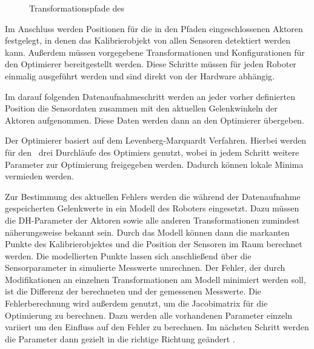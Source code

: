 \begin{figure}[Htbp] \centering {}
   \caption{Transformationspfade des \cob} \label{fig:pfade} \end{figure}

Im Anschluss werden Positionen für die in den Pfaden eingeschlossenen Aktoren
festgelegt, in denen das Kalibrierobjekt von allen Sensoren detektiert werden
kann. Außerdem müssen vorgegebene Transformationen und Konfigurationen für den
Optimierer bereitgestellt werden. Diese Schritte müssen für jeden Roboter
einmalig ausgeführt werden und sind direkt von der Hardware abhängig. 

Im darauf folgenden Datenaufnahmeschritt werden an jeder vorher definierten
Position die Sensordaten zusammen mit den aktuellen Gelenkwinkeln der Aktoren
aufgenommen. Diese Daten werden dann an den Optimierer übergeben.

Der Optimierer basiert auf dem Levenberg-Marquardt Verfahren\cite[Abschnitt 1]{pr2_estimation}.
Hierbei werden
für den \cob\ drei Durchläufe des Optimiers genutzt, wobei in jedem Schritt
weitere Parameter zur Optimierung freigegeben werden. Dadurch können lokale
Minima vermieden werden.

Zur Bestimmung des aktuellen Fehlers werden die während der Datenaufnahme
gespeicherten Gelenkwerte in ein Modell des Roboters eingesetzt. Dazu müssen
die \ac{DH-Parameter} der Aktoren sowie alle anderen Transformationen zumindest
näherungsweise bekannt sein. Durch das Modell können dann die markanten Punkte
des Kalibrierobjektes und die Position der Sensoren im Raum berechnet werden.
Die modellierten Punkte lassen sich anschließend über die Sensorparameter in
simulierte Messwerte umrechnen. Der Fehler, der durch Modifikationen an einzelnen
Transformationen am Modell minimiert werden soll, ist die Differenz der
berechneten und der gemessenen Messwerte.\cite{levi2012autonomous}
Die Fehlerberechnung wird außerdem genutzt, um die Jacobimatrix für die
Optimierung zu berechnen. Dazu werden alle
vorhandenen Parameter einzeln variiert um den Einfluss auf den Fehler zu berechnen.
Im nächsten Schritt werden die Parameter dann gezielt in die richtige Richtung
geändert \cite{forsyth2011}.



